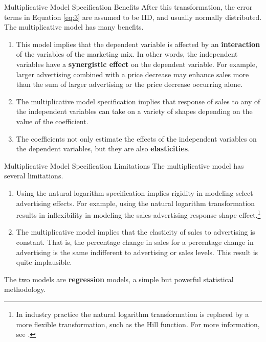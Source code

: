 \documentclass[pdf]{beamer}
\newcommand{\empr}[1]{{\color{franklinblue}\textbf{#1}}}
\theoremstyle{remark}
\theoremstyle{definition}
\begin{document}
\begin{frame}[t]{Multiplicative Model Specification Benefits}
After this transformation, the error terms in Equation \ref{eq:3} are assumed to be IID, and usually normally distributed. \\
\vspace{1.5ex}
The multiplicative model has many benefits. \\
\vspace{0.0ex}
\small
\begin{enumerate}
\item This model implies that the dependent variable is affected by an \empr{interaction} of the variables of the marketing mix. In other words, the independent variables have a \empr{synergistic effect} on the dependent variable. For example, larger advertising combined with a price decrease may enhance sales more than the sum of larger advertising or the price decrease occurring alone.
\item The multiplicative model specification implies that response of sales to any of the independent variables can take on a variety of shapes depending on the value of the coefficient.
\item The coefficients not only estimate the effects of the independent variables on the dependent variables, but they are also \empr{elasticities}.
\end{enumerate}
\end{frame}

\begin{frame}[t]{Multiplicative Model Specification Limitations}
The multiplicative model has several limitations. \\
\vspace{0.0ex}
\small
\begin{enumerate}
\item Using the natural logarithm specification implies rigidity in modeling select advertising  effects. For example, using the natural logarithm transformation results in  inflexibility in modeling the sales-advertising response shape effect.\footnote{In industry practice the natural logarithm transformation is replaced by a more flexible transformation, such as the Hill function.  For more information, see \cite{jin2017bayesian}.}
\item The multiplicative model implies that the elasticity of sales to advertising is constant. That is, the percentage change in sales for a percentage change in advertising is the same indifferent to advertising or sales levels. This result is quite implausible.
\end{enumerate}
\normalsize
\vspace{-2.0ex}
The two models are \empr{regression} models, a simple but powerful statistical methodology. 
\end{frame}
\end{document}
